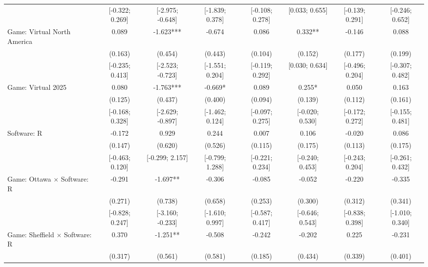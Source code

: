 \begin{tabular}{l*{7}{c}}
                    &[-0.322; 0.269]   &[-2.975; -0.648]   &[-1.839; 0.378]   &[-0.108; 0.278]   &[0.033; 0.655]   &[-0.139; 0.291]   &[-0.246; 0.652]   \\
Game: Virtual North America&       0.089   &      -1.623***&      -0.674   &       0.086   &       0.332** &      -0.146   &       0.088   \\
                    &     (0.163)   &     (0.454)   &     (0.443)   &     (0.104)   &     (0.152)   &     (0.177)   &     (0.199)   \\
                    &[-0.235; 0.413]   &[-2.523; -0.723]   &[-1.551; 0.204]   &[-0.119; 0.292]   &[0.030; 0.634]   &[-0.496; 0.204]   &[-0.307; 0.482]   \\
Game: Virtual 2025  &       0.080   &      -1.763***&      -0.669*  &       0.089   &       0.255*  &       0.050   &       0.163   \\
                    &     (0.125)   &     (0.437)   &     (0.400)   &     (0.094)   &     (0.139)   &     (0.112)   &     (0.161)   \\
                    &[-0.168; 0.328]   &[-2.629; -0.897]   &[-1.462; 0.124]   &[-0.097; 0.275]   &[-0.020; 0.530]   &[-0.172; 0.272]   &[-0.155; 0.481]   \\
Software: R         &      -0.172   &       0.929   &       0.244   &       0.007   &       0.106   &      -0.020   &       0.086   \\
                    &     (0.147)   &     (0.620)   &     (0.526)   &     (0.115)   &     (0.175)   &     (0.113)   &     (0.175)   \\
                    &[-0.463; 0.120]   &[-0.299; 2.157]   &[-0.799; 1.288]   &[-0.221; 0.234]   &[-0.240; 0.453]   &[-0.243; 0.204]   &[-0.261; 0.432]   \\
Game: Ottawa $\times$ Software: R&      -0.291   &      -1.697** &      -0.306   &      -0.085   &      -0.052   &      -0.220   &      -0.335   \\
                    &     (0.271)   &     (0.738)   &     (0.658)   &     (0.253)   &     (0.300)   &     (0.312)   &     (0.341)   \\
                    &[-0.828; 0.247]   &[-3.160; -0.233]   &[-1.610; 0.997]   &[-0.587; 0.417]   &[-0.646; 0.543]   &[-0.838; 0.398]   &[-1.010; 0.340]   \\
Game: Sheffield $\times$ Software: R&       0.370   &      -1.251** &      -0.508   &      -0.242   &      -0.202   &       0.225   &      -0.231   \\
                    &     (0.317)   &     (0.561)   &     (0.581)   &     (0.185)   &     (0.434)   &     (0.339)   &     (0.401)   \\

\end{tabular}

